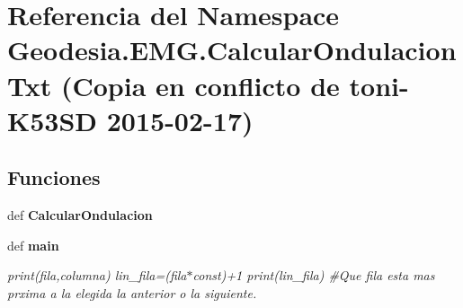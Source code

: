 \section{Referencia del Namespace Geodesia.\-E\-M\-G.\-Calcular\-Ondulacion\-Txt (Copia en conflicto de toni-\/\-K53\-S\-D 2015-\/02-\/17)}
\label{namespaceGeodesia_1_1EMG_1_1CalcularOndulacionTxt_01_07Copia_01en_01conflicto_01de_01toni-K53SD_012015-02-17_08}
\subsection*{Funciones}
\begin{DoxyCompactItemize}
\item 
def {\bf Calcular\-Ondulacion}
\item 
def {\bf main}
\begin{DoxyCompactList}\small\item\em print(fila,columna) lin\-\_\-fila=(fila$\ast$const)+1 print(lin\-\_\-fila) \#\-Que fila esta mas prxima a la elegida la anterior o la siguiente. \end{DoxyCompactList}\end{DoxyCompactItemize}
